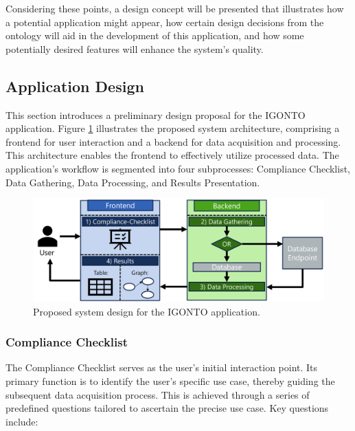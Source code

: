 \documentclass[
  a4paper,  %
  twoside,  %
  bibliography=totoc,
  headsepline,
  cleardoublepage=empty,
  parskip=half,
  draft=false
]{scrbook}
\begin{document}
Considering these points, a design concept will be presented that illustrates how a potential application might appear, how certain design decisions from the ontology will aid in the development of this application, and how some potentially desired features will enhance the system's quality. \\


\subsection{Application Design}

This section introduces a preliminary design proposal for the IGONTO application. Figure \ref{fig:systemdesign} illustrates the proposed system architecture, comprising a frontend for user interaction and a backend for data acquisition and processing. This architecture enables the frontend to effectively utilize processed data. The application's workflow is segmented into four subprocesses: Compliance Checklist, Data Gathering, Data Processing, and Results Presentation.\\

\begin{figure}
\centering
\includegraphics[width=\textwidth]{graphics/systemdesign.png}
\caption{Proposed system design for the IGONTO application.}
\label{fig:systemdesign}
\end{figure}

\subsubsection{Compliance Checklist}\label{sec:complianceChecklist}

The Compliance Checklist serves as the user's initial interaction point. Its primary function is to identify the user's specific use case, thereby guiding the subsequent data acquisition process. This is achieved through a series of predefined questions tailored to ascertain the precise use case. Key questions include:
\end{document}
